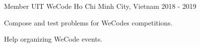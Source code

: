 \begin{cventries}

    \cventry
    {Member}
    {UIT WeCode}
    {Ho Chi Minh City, Vietnam}
    {2018 - 2019}
    {
        \begin{cvitems}
            \item {Compose and test problems for WeCodes competitions.}
            \item {Help organizing WeCode events.}
        \end{cvitems}
    }

\end{cventries}
